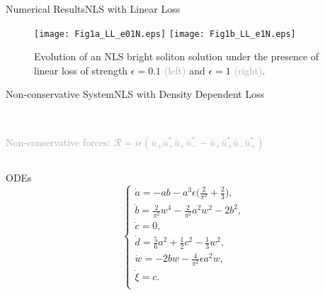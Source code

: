 \begin{frame}[c]{Numerical Results}{NLS with Linear Loss}
\begin{figure}[H!]
\centering
\texttt{[image: Fig1a\_LL\_e01N.eps]} \quad
\texttt{[image: Fig1b\_LL\_e1N.eps]}
\caption{
Evolution of an NLS bright soliton solution under the presence of linear loss
of strength $\epsilon=0.1$ \textcolor{darkgray}{(left)} and $\epsilon=1$ \textcolor{darkgray}{(right)}.
}
%
\end{figure}
\end{frame} 
%



\begin{frame}[c]{Non-conservative System}{NLS with Density Dependent Loss}
\begin{center}
   \\
\end{center}
 
\textcolor{darkgray}{Non-conservative forces:  $\mathcal{R}  =  i\epsilon ( \bar{u}_+ \bar{u}_+^* \bar{u}_+\bar{u}_-^* -  \bar{u}_+ \bar{u}_+^* \bar{u}_-\bar{u}_+^*) $}
\begin{center}
\begin{columns}
\begin{column}{0.5\textwidth}
\begin{alertblock}{ODEs}
\vspace{-1em}
 \[ \begin{cases} 
 \dot{a} = - ab - a^3 \epsilon \Big( \frac{2 }{\pi^2} + \frac{2}{3} \Big), \\ 
 \dot{b} = \frac{2}{\pi^2} w^4 - \frac{2}{\pi^2} a^2 w^2 - 2 b^2, \\
 \dot{c} = 0, \\ 
 \dot{d} = \frac{5}{6} a^2 + \frac{1}{2} c^2 - \frac{1}{3} w^2, \\
\dot{w} = -2bw - \frac{4}{\pi^2} \epsilon a^2 w , \\
 \dot{\xi} = c. \\ 
 \end{cases} \] 
\end{alertblock}
\end{column}
\end{columns}
\end{center}
\end{frame}


